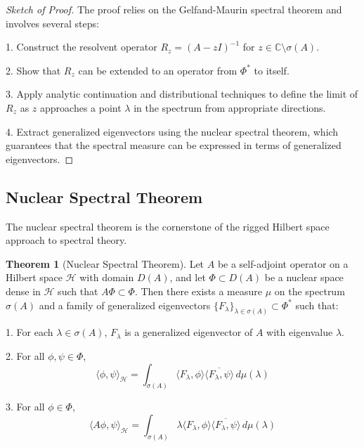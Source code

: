 \documentclass[12pt,a4paper]{article}
\theoremstyle{definition}
\newtheorem{theorem}{Theorem}
\begin{document}
\begin{proof}[Sketch of Proof]
The proof relies on the Gelfand-Maurin spectral theorem and involves several steps:

1. Construct the resolvent operator $R_z = (A - zI)^{-1}$ for $z \in \mathbb{C} \setminus \sigma(A)$.

2. Show that $R_z$ can be extended to an operator from $\Phi^*$ to itself.

3. Apply analytic continuation and distributional techniques to define the limit of $R_z$ as $z$ approaches a point $\lambda$ in the spectrum from appropriate directions.

4. Extract generalized eigenvectors using the nuclear spectral theorem, which guarantees that the spectral measure can be expressed in terms of generalized eigenvectors.
\end{proof}

\subsection{Nuclear Spectral Theorem}

The nuclear spectral theorem is the cornerstone of the rigged Hilbert space approach to spectral theory.

\begin{theorem}[Nuclear Spectral Theorem]
Let $A$ be a self-adjoint operator on a Hilbert space $\mathcal{H}$ with domain $D(A)$, and let $\Phi \subset D(A)$ be a nuclear space dense in $\mathcal{H}$ such that $A\Phi \subset \Phi$. Then there exists a measure $\mu$ on the spectrum $\sigma(A)$ and a family of generalized eigenvectors $\{F_\lambda\}_{\lambda \in \sigma(A)} \subset \Phi^*$ such that:

1. For each $\lambda \in \sigma(A)$, $F_\lambda$ is a generalized eigenvector of $A$ with eigenvalue $\lambda$.

2. For all $\phi, \psi \in \Phi$,
\begin{equation}
    \langle \phi, \psi \rangle_{\mathcal{H}} = \int_{\sigma(A)} \langle F_\lambda, \phi \rangle \overline{\langle F_\lambda, \psi \rangle} \, d\mu(\lambda)
\end{equation}

3. For all $\phi \in \Phi$,
\begin{equation}
    \langle A\phi, \psi \rangle_{\mathcal{H}} = \int_{\sigma(A)} \lambda \langle F_\lambda, \phi \rangle \overline{\langle F_\lambda, \psi \rangle} \, d\mu(\lambda)
\end{equation}
\end{theorem}
\end{document}
